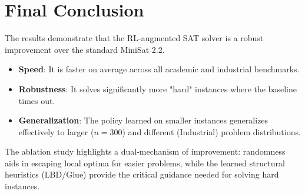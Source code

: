 \documentclass[11pt, a4paper]{article}
\begin{document}
\section{Final Conclusion}
The results demonstrate that the RL-augmented SAT solver is a robust improvement over the standard MiniSat 2.2.
\begin{itemize}
    \item \textbf{Speed}: It is faster on average across all academic and industrial benchmarks.
    \item \textbf{Robustness}: It solves significantly more "hard" instances where the baseline times out.
    \item \textbf{Generalization}: The policy learned on smaller instances generalizes effectively to larger ($n=300$) and different (Industrial) problem distributions.
\end{itemize}
The ablation study highlights a dual-mechanism of improvement: randomness aids in escaping local optima for easier problems, while the learned structural heuristics (LBD/Glue) provide the critical guidance needed for solving hard instances.
\end{document}

